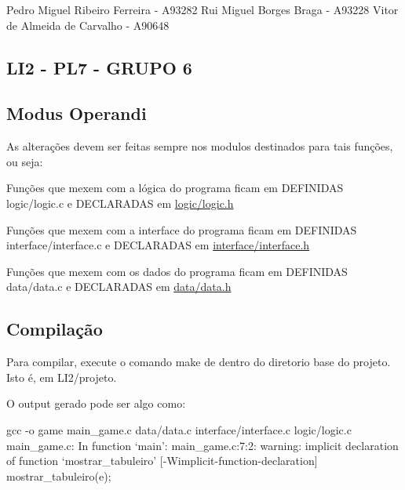 Pedro Miguel Ribeiro Ferreira -\/ A93282 Rui Miguel Borges Braga -\/ A93228 Vitor de Almeida de Carvalho -\/ A90648

\subsection*{L\+I2 -\/ P\+L7 -\/ G\+R\+U\+PO 6 }

\subsection*{Modus Operandi }

As alterações devem ser feitas sempre nos modulos destinados para tais funções, ou seja\+:

Funções que mexem com a lógica do programa ficam em D\+E\+F\+I\+N\+I\+D\+AS logic/logic.\+c e D\+E\+C\+L\+A\+R\+A\+D\+AS em \hyperlink{logic_8h}{logic/logic.\+h}

Funções que mexem com a interface do programa ficam em D\+E\+F\+I\+N\+I\+D\+AS interface/interface.\+c e D\+E\+C\+L\+A\+R\+A\+D\+AS em \hyperlink{interface_8h}{interface/interface.\+h}

Funções que mexem com os dados do programa ficam em D\+E\+F\+I\+N\+I\+D\+AS data/data.\+c e D\+E\+C\+L\+A\+R\+A\+D\+AS em \hyperlink{data_8h}{data/data.\+h}

\subsection*{Compilação }

Para compilar, execute o comando \textquotesingle{}make\textquotesingle{} de dentro do diretorio base do projeto. Isto é, em L\+I2/projeto.

O output gerado pode ser algo como\+: 
\begin{DoxyCode}
gcc -o game main\_game.c data/data.c interface/interface.c logic/logic.c
main\_game.c: In function ‘main’:
main\_game.c:7:2: warning: implicit declaration of function ‘mostrar\_tabuleiro’
       [-Wimplicit-function-declaration]
  mostrar\_tabuleiro(e);
\end{DoxyCode}
 